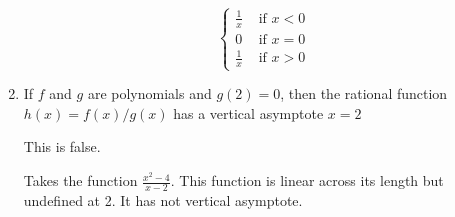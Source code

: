 \documentclass{article}
\begin{document}
\begin{enumerate}
		\[ \begin{cases}
			\frac{1}{x} & \text{ if } x < 0 \\
			0 & \text{ if } x = 0 \\
			\frac{1}{x} & \text{ if } x > 0 
		\end{cases} \]
	
			
	\item If $f$ and $g$ are polynomials and $g(2) = 0$, then the rational
		function $h(x) = f(x)/g(x)$ has a vertical asymptote $x = 2$

		This is false.

		Takes the function $\frac{x^2 - 4}{x-2}$. This function is linear
		across its length but undefined at 2. It has not vertical asymptote.

		
\end{enumerate}
\end{document}
